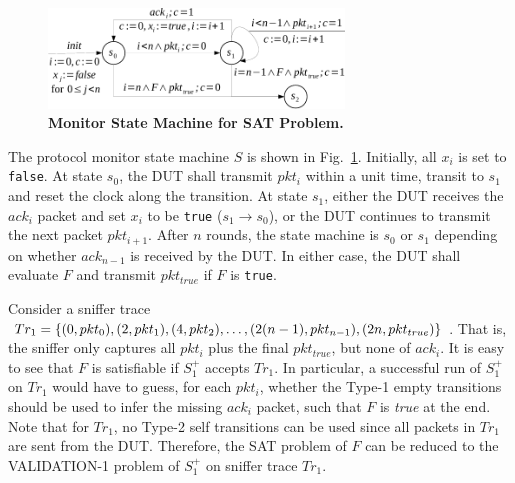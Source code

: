 \begin{figure}[h!]
  \centering
  \includegraphics[width=0.7\textwidth]{./figures/sat_sm.pdf}
  \caption{\textbf{Monitor State Machine for SAT Problem.}}
  \label{fig:sat}
\end{figure}



The protocol monitor state machine $S$ is shown in Fig.~\ref{fig:sat}.
%
Initially, all $x_i$ is set to \texttt{false}.
%
At state $s_0$, the DUT shall transmit $pkt_i$ within a unit time, transit to
$s_1$ and reset the clock along the transition.
At state $s_1$, either the DUT receives the $ack_i$ packet and
set $x_i$ to be \texttt{true} ($s_1 \rightarrow s_0$), or the DUT continues to
transmit the next packet $pkt_{i+1}$.
%
After $n$ rounds, the state machine is $s_0$ or $s_1$ depending on whether
$ack_{n-1}$ is received by the DUT.
%
In either case, the DUT shall evaluate $F$ and transmit $pkt_{true}$ if $F$ is
\texttt{true}.  

Consider a sniffer trace $Tr_1=\{(0, pkt_0), (2, pkt_1),\\ (4,
pkt_2),\ldots, (2(n-1), pkt_{n-1}), (2n, pkt_{true})\}$.
%
That is, the sniffer only captures all $pkt_i$ plus the final $pkt_{true}$, but none of
$ack_i$.
%
It is easy to see that $F$ is satisfiable if $S_1^+$ accepts
$Tr_1$.
%
In particular, a successful run of $S_1^+$ on $Tr_1$ would have to
guess, for each $pkt_i$, whether the Type-1 empty transitions should be used
to infer the missing $ack_i$ packet, such that $F$ is \textit{true} at the
end.
%
Note that for $Tr_1$, no Type-2 self transitions can be used since all
packets in $Tr_1$ are sent from the DUT.
%
Therefore, the SAT problem of $F$ can be reduced to the VALIDATION-1 problem
of $S^+_1$ on sniffer trace $Tr_1$.


